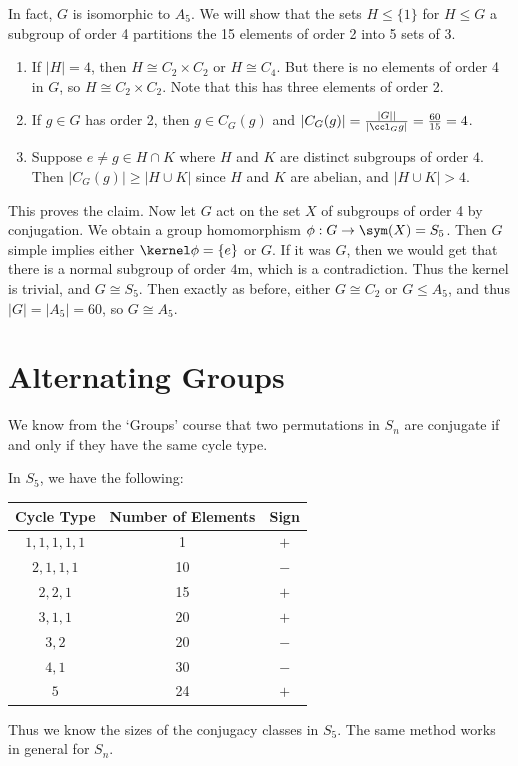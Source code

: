 \documentclass[a4paper]{scrartcl}
\begin{document}
\begin{example}
In fact, $G$ is isomorphic to $A_5$. We will show that the sets $H \leq \{1\}$ for $H \leq G$ a subgroup of order 4 partitions the 15 elements of order 2 into 5 sets of 3. 
\begin{enumerate}
	\item If $|H| = 4$, then $H \cong C_2 \times C_2$ or $H \cong C_4$. But there is no elements of order 4 in $G$, so $H \cong C_2 \times C_2$. Note that this has three elements of order 2.
	\item If $g \in G$ has order 2, then $g \in C_G(g)$ and $|C_G(g)| = \frac{|G||}{|\ccl_G{g}|} = \frac{60}{15} = 4$.
	\item Suppose $e \neq g \in H \cap K$ where $H$ and $K$ are distinct subgroups of order $4$. Then $|C_G(g)| \geq |H \cup K|$ since $H$ and $K$ are abelian, and $|H \cup K| > 4$.
\end{enumerate}
This proves the claim. Now let $G$ act on the set $X$ of subgroups of order 4 by conjugation. We obtain a group homomorphism $\phi:G \rightarrow \sym(X) = S_5$. Then $G$ simple implies either $\kernel \phi = \{e\}$ or $G$. If it was $G$, then we would get that there is a normal subgroup of order $4$m, which is a contradiction. Thus the kernel is trivial, and $G \cong S_5$. Then exactly as before, either $G \cong C_2$ or $G \leq A_5$, and thus $|G| = |A_5| = 60$, so $G \cong A_5$.  
\end{example}

\section{Alternating Groups}

We know from the `Groups' course that two permutations in $S_n$ are conjugate if and only if they have the same cycle type.

\begin{example}
	In $S_5$, we have the following:
	\begin{center}
		\begin{tabular}{@{}ccc@{}}
			\toprule
			Cycle Type    & Number of Elements & Sign \\ \midrule
			$1, 1, 1, 1, 1$  & 1   &   $+$  \\ 
			$2, 1, 1, 1$  & 10   &   $-$  \\
			$2, 2, 1$  & 15   &   $+$  \\
			$3, 1, 1$  & 20   &   $+$  \\
			$3, 2$  & 20   &   $-$  \\
			$4, 1$  & 30   &   $-$  \\
			$5$  & 24   &   $+$  \\
			\bottomrule
			\end{tabular}
	\end{center}
	Thus we know the sizes of the conjugacy classes in $S_5$. The same method works in general for $S_n$.
\end{example}
\end{document}
